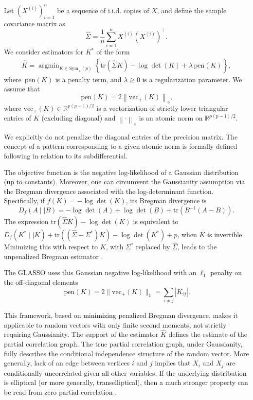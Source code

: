 \documentclass[12pt]{amsart}
\numberwithin{equation}{section}
\numberwithin{equation}{section}
\theoremstyle{definition}
\newcommand{\R}{\mathbb{R}}
\newcommand{\norm}{\,\mathrm{pen}}
\newcommand{\poly}[1]{\left\|#1\right\|_\diamond}
\DeclareMathOperator*{\argmin}{\arg\min}
\newcommand{\tr}[1]{\mathrm{tr}\left(#1\right)}
\newcommand{\vp}[1]{\mathrm{vec_+}(#1)}
\begin{document}
Let $(X^{(i)})_{i=1}^n$ be a sequence of i.i.d. copies of $X$, and define the sample covariance matrix as
\[
\hat\Sigma = \frac{1}{n} \sum_{i=1}^n X^{(i)} (X^{(i)})^\top.
\]
We consider estimators for $K^\ast$ of the form
\begin{align*}
	\hat K = \argmin_{K\in \mathrm{Sym}_+(p)} \left\{ \tr{\hat{\Sigma}K}-\log\det(K) + \lambda \norm(K)\right\},
\end{align*}
where $\norm(K)$ is a penalty term, and $\lambda \geq 0$ is a regularization parameter. 
We assume that 
\[
\norm(K) = 2 \poly{\vp{K}},
\]
where $\vp{K}\in\R^{p(p-1)/2}$ is a vectorization of strictly lower triangular entries of $K$ (excluding diagonal) and  $\poly{\cdot}$ is an atomic norm on $\R^{p(p-1)/2}$.

We explicitly do not penalize the diagonal entries of the precision matrix. The concept of a pattern corresponding to a given atomic norm is formally defined following \citep{POLYNORMS} in relation to its subdifferential.

The objective function is the negative log-likelihood of a Gaussian distribution (up to constants). Moreover, one can circumvent the Gaussianity assumption via the Bregman divergence associated with the log-determinant function. Specifically, if $f(K) = -\log\det(K)$, its Bregman divergence is
\[
D_f(A\mid\mid B) = -\log\det(A)+\log\det(B)+\tr{B^{-1}(A-B)}.
\]
The expression $\tr{\hat{\Sigma}K}-\log\det(K)$ is equivalent to $D_f(K^\ast \mid\mid K) + \tr{(\hat{\Sigma}-\Sigma^\ast)K} - \log\det(K^\ast) + p$, when $K$ is invertible. Minimizing this with respect to $K$, with $\Sigma^\ast$ replaced by $\hat{\Sigma}$, leads to the unpenalized Bregman estimator \citep{ravikumar2011graphical, zwiernik2023entropic}.

The GLASSO uses this Gaussian negative log-likelihood with an $\ell_1$ penalty on the off-diagonal elements
\[
\norm(K) = 2 \|\vp{K}\|_1 = \sum_{i\neq j}|K_{ij}|.
\] 

 This framework,  based on minimizing  penalized  Bregman divergence, makes it applicable to random vectors with only finite second moments, not strictly requiring Gaussianity. The support of the estimator $\hat{K}$ defines the estimate of the partial correlation graph. The true partial correlation graph, under Gaussianity, fully describes the conditional independence structure of the random vector. More generally, lack of an edge between vertices $i$ and $j$ implies that $X_i$ and $X_j$ are conditionally uncorrelated given all other variables. If the underlying distribution is elliptical (or more generally, transelliptical), then a much stronger property can be read from zero partial correlation \citep{RosselZwiernik21}.
 
\end{document}
